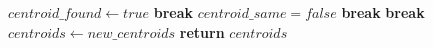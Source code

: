     \begin{algorithm}
    \begin{algorithmic} [1]
            \State $centroid\_found \gets true$
            \State \textbf{break}
          \EndIf
        \EndFor
          \State $centroid\_same = false$
          \State \textbf{break}
        \EndIf
      \EndFor
        \State \textbf{break}
      \Else
        \State $centroids \gets new\_centroids$
      \EndIf
    \EndWhile
    \State \textbf{return} $centroids$
\EndProcedure
\end{algorithmic}
\end{algorithm}









